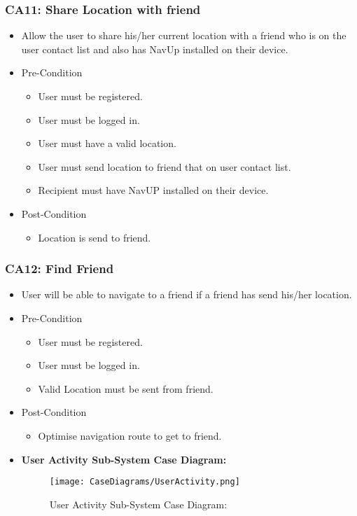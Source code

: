 \documentclass[12pt,a4paper]{article}
\begin{document}
		\subsubsection{CA11: Share Location with friend}
			\begin{itemize}
				\item Allow the user to share his/her current location with a friend who is on the user contact list and also has NavUp installed on their device.
				\item Pre-Condition
					\begin{itemize}
						\item User must be registered.
						\item User must be logged in.
						\item User must have a valid location.
						\item User must send location to friend that on user contact list.
						\item Recipient must have NavUP installed on their device.
					\end{itemize}
				\item Post-Condition
					\begin{itemize}
						\item Location is send to friend.
					\end{itemize}
			\end{itemize}
		\subsubsection{CA12: Find Friend}
			\begin{itemize}
				\item User will be able to navigate to a friend if a friend has send his/her location.
				\item Pre-Condition
					\begin{itemize}
						\item User must be registered.
						\item User must be logged in.
						\item Valid Location must be sent from friend.
					\end{itemize}
				\item Post-Condition
					\begin{itemize}
						\item Optimise navigation route to get to friend.
					\end{itemize}
				\item \textbf{User Activity Sub-System Case Diagram:}
				\begin{figure}[H]
					\texttt{[image: CaseDiagrams/UserActivity.png]}
					\caption{User Activity Sub-System Case Diagram:}
				\end{figure}
			\end{itemize}
\end{document}
